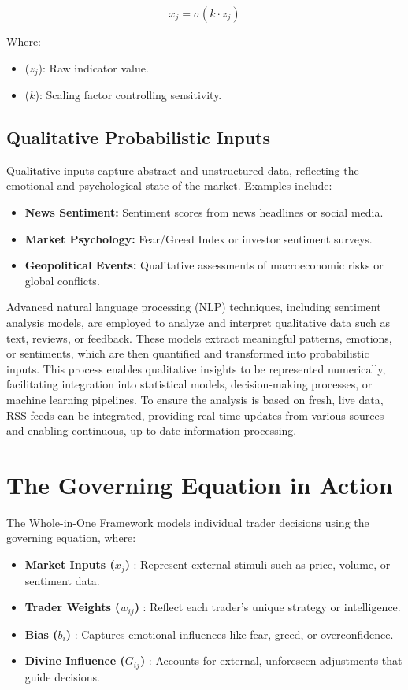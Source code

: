 \documentclass[a4]{article}
\begin{document}
$$
x_j = \sigma(k \cdot z_j)
$$

Where:

\begin{itemize}
\item ($z_j$): Raw indicator value.
\item ($k$): Scaling factor controlling sensitivity.
\end{itemize}

\subsection{Qualitative Probabilistic Inputs} 
Qualitative inputs capture abstract and unstructured data, reflecting the emotional and psychological state of the market. Examples include:

\begin{itemize}
\item   {\bf News Sentiment:}  Sentiment scores from news headlines or social media.
\item {\bf Market Psychology:}  Fear/Greed Index or investor sentiment surveys.
\item {\bf Geopolitical Events:}  Qualitative assessments of macroeconomic risks or global conflicts.
\end{itemize}

Advanced natural language processing (NLP) techniques, including sentiment analysis models, are employed to analyze and interpret qualitative data such as text, reviews, or feedback. These models extract meaningful patterns, emotions, or sentiments, which are then quantified and transformed into probabilistic inputs. This process enables qualitative insights to be represented numerically, facilitating integration into statistical models, decision-making processes, or machine learning pipelines. To ensure the analysis is based on fresh, live data, RSS feeds can be integrated, providing real-time updates from various sources and enabling continuous, up-to-date information processing.


\section{The Governing Equation in Action}

The Whole-in-One Framework models individual trader decisions using the governing equation, where:

\begin{itemize}
\item  {\bf Market Inputs ($x_j$)} : Represent external stimuli such as price, volume, or sentiment data.
\item {\bf Trader Weights ($w_{ij}$)} : Reflect each trader's unique strategy or intelligence.
\item  {\bf Bias ($b_i$)} : Captures emotional influences like fear, greed, or overconfidence.
\item  {\bf Divine Influence ($G_{ij}$)} : Accounts for external, unforeseen adjustments that guide decisions.
\end{itemize}
\end{document}
